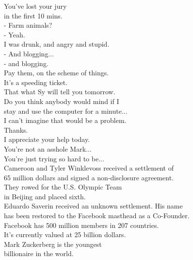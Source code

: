 \documentclass{article}
\begin{document}
\begin{multicols}{3}
You've lost your jury\\
in the first 10 mins.\\
- Farm animals?\\
- Yeah.\\
I was drunk, and angry and stupid.\\
- And blogging...\\
- and blogging.\\
Pay them, on the scheme of things.\\
It's a speeding ticket.\\
That what Sy will tell you tomorrow.\\
Do you think anybody would mind if I\\
stay and use the computer for a minute...\\
I can't imagine that would be a problem.\\
Thanks.\\
I appreciate your help today.\\
You're not an asshole Mark...\\
You're just trying so hard to be...\\
Cameroon and Tyler Winklevoss received a settlement of\\
 65 million dollars and signed a non-disclosure agreement.\\
They rowed for the U.S. Olympic Team\\
in Beijing and placed sixth.\\
Eduardo Saverin received an unknown settlement. His name\\
has been restored to the Facebook masthead as a Co-Founder.\\
Facebook has 500 million members in 207 countries.\\
It's currently valued at 25 billion dollars.\\
Mark Zuckerberg is the youngest\\
billionaire in the world.\\

\end{multicols}
\end{document}
